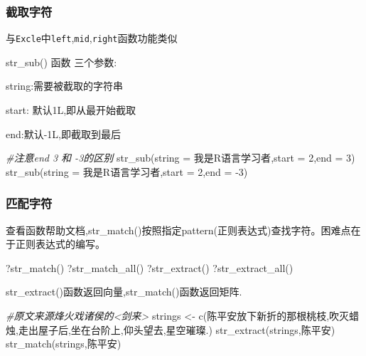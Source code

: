 \documentclass[
]{book}
\newenvironment{Shaded}{\begin{snugshade}}{\end{snugshade}}
\newcommand{\AttributeTok}[1]{\textcolor[rgb]{0.77,0.63,0.00}{#1}}
\newcommand{\CommentTok}[1]{\textcolor[rgb]{0.56,0.35,0.01}{\textit{#1}}}
\newcommand{\DecValTok}[1]{\textcolor[rgb]{0.00,0.00,0.81}{#1}}
\newcommand{\FunctionTok}[1]{\textcolor[rgb]{0.00,0.00,0.00}{#1}}
\newcommand{\NormalTok}[1]{#1}
\newcommand{\OtherTok}[1]{\textcolor[rgb]{0.56,0.35,0.01}{#1}}
\newcommand{\SpecialCharTok}[1]{\textcolor[rgb]{0.00,0.00,0.00}{#1}}
\newcommand{\StringTok}[1]{\textcolor[rgb]{0.31,0.60,0.02}{#1}}
\begin{document}
\hypertarget{ux622aux53d6ux5b57ux7b26}{%
\subsubsection{截取字符}\label{ux622aux53d6ux5b57ux7b26}}

与\texttt{Excle}中\texttt{left},\texttt{mid},\texttt{right}函数功能类似

str\_sub() 函数 三个参数:

string:需要被截取的字符串

start: 默认1L,即从最开始截取

end:默认-1L,即截取到最后

\begin{Shaded}
\begin{Highlighting}[]
\CommentTok{\#注意end 3 和 {-}3的区别}
\FunctionTok{str\_sub}\NormalTok{(}\AttributeTok{string =} \StringTok{\textquotesingle{}我是R语言学习者\textquotesingle{}}\NormalTok{,}\AttributeTok{start =} \DecValTok{2}\NormalTok{,}\AttributeTok{end =} \DecValTok{3}\NormalTok{)}
\FunctionTok{str\_sub}\NormalTok{(}\AttributeTok{string =} \StringTok{\textquotesingle{}我是R语言学习者\textquotesingle{}}\NormalTok{,}\AttributeTok{start =} \DecValTok{2}\NormalTok{,}\AttributeTok{end =} \SpecialCharTok{{-}}\DecValTok{3}\NormalTok{)}
\end{Highlighting}
\end{Shaded}

\hypertarget{ux5339ux914dux5b57ux7b26}{%
\subsubsection{匹配字符}\label{ux5339ux914dux5b57ux7b26}}

查看函数帮助文档,str\_match()按照指定pattern(正则表达式)查找字符。困难点在于正则表达式的编写。

\begin{Shaded}
\begin{Highlighting}[]
\NormalTok{?}\FunctionTok{str\_match}\NormalTok{()}
\NormalTok{?}\FunctionTok{str\_match\_all}\NormalTok{()}
\NormalTok{?}\FunctionTok{str\_extract}\NormalTok{()}
\NormalTok{?}\FunctionTok{str\_extract\_all}\NormalTok{()}
\end{Highlighting}
\end{Shaded}

str\_extract()函数返回向量,str\_match()函数返回矩阵.

\begin{Shaded}
\begin{Highlighting}[]
\CommentTok{\#原文来源烽火戏诸侯的\textless{}剑来\textgreater{}}
\NormalTok{strings }\OtherTok{\textless{}{-}} \FunctionTok{c}\NormalTok{(}\StringTok{\textquotesingle{}陈平安放下新折的那根桃枝,吹灭蜡烛,走出屋子后,坐在台阶上,仰头望去,星空璀璨.\textquotesingle{}}\NormalTok{) }
\FunctionTok{str\_extract}\NormalTok{(strings,}\StringTok{\textquotesingle{}陈平安\textquotesingle{}}\NormalTok{)}
\FunctionTok{str\_match}\NormalTok{(strings,}\StringTok{\textquotesingle{}陈平安\textquotesingle{}}\NormalTok{)}
\end{Highlighting}
\end{Shaded}
\end{document}
